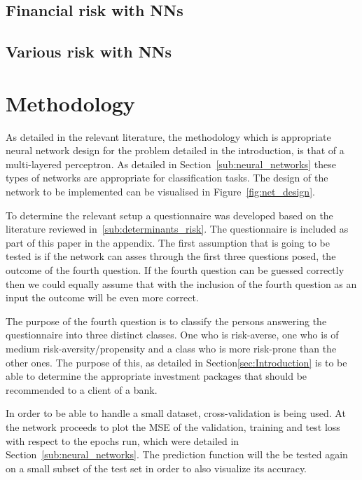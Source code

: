 \documentclass{article}
\begin{document}
\subsection{Financial risk with NNs}
\label{sub:financial_risk_nn}


\subsection{Various risk with NNs}
\label{sub:various_risk_nn}

\section{Methodology}
\label{sec:methodology}

As detailed in the relevant literature, the methodology which is appropriate neural network design for the problem detailed in the introduction, is that of a multi-layered perceptron. As detailed in Section~\ref{sub:neural_networks} these types of networks are appropriate for classification tasks. The design of the network to be implemented can be visualised in Figure~\ref{fig:net_design}. 

To determine the relevant setup a questionnaire was developed based on the literature reviewed in~\ref{sub:determinants_risk}. The questionnaire is included as part of this paper in the appendix. The first assumption that is going to be tested is if the network can asses through the first three questions posed, the outcome of the fourth question. If the fourth question can be guessed correctly then we could equally assume that with the inclusion of the fourth question as an input the outcome will be even more correct. 

The purpose of the fourth question is to classify the persons answering the questionnaire into three distinct classes. One who is risk-averse, one who is of medium risk-aversity/propensity and a class who is more risk-prone than the other ones. The purpose of this, as detailed in Section\ref{sec:Introduction} is to be able to determine the appropriate investment packages that should be recommended to a client of a bank.

In order to be able to handle a small dataset, cross-validation is being used. At the network proceeds to plot the MSE of the validation, training and test loss with respect to the epochs run, which were detailed in Section~\ref{sub:neural_networks}. The prediction function will the be tested again on a small subset of the test set in order to also visualize its accuracy.
\end{document}
